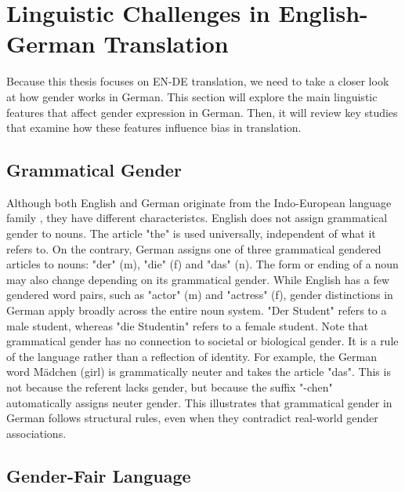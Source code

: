 \section{Linguistic Challenges in English-German Translation}

Because this thesis focuses on EN-DE translation, we need to take a closer look at how gender works in German. This section will explore the main linguistic features that affect gender expression in German. Then, it will review key studies that examine how these features influence bias in translation.

\subsection{Grammatical Gender}
Although both English and German originate from the Indo-European language family \citep{baldiEnglishIndoEuropeanLanguage2008}, they have different characteristcs. English does not assign grammatical gender to nouns. The article "the" is used universally, independent of what it refers to. On the contrary, German assigns one of three grammatical gendered articles to nouns: "der" (m), "die" (f) and "das" (n). The form or ending of a noun may also change depending on its grammatical gender. While English has a few gendered word pairs, such as "actor" (m) and "actress" (f), gender distinctions in German apply broadly across the entire noun system. "Der Student" refers to a male student, whereas "die Studentin" refers to a female student. Note that grammatical gender has no connection to societal or biological gender. It is a rule of the language rather than a reflection of identity. For example, the German word Mädchen (girl) is grammatically neuter and takes the article "das". This is not because the referent lacks gender, but because the suffix "-chen" automatically assigns neuter gender. This illustrates that grammatical gender in German follows structural rules, even when they contradict real-world gender associations.

\subsection{Gender-Fair Language}

